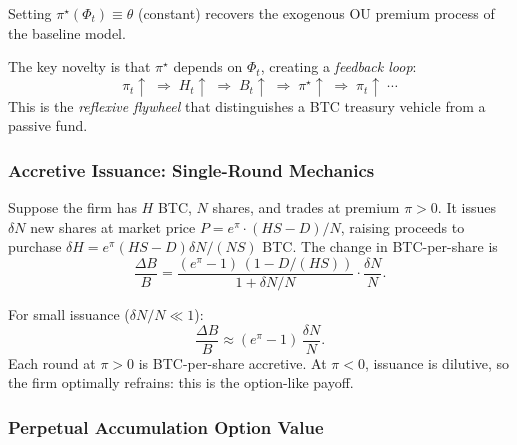 \begin{remark}
  Setting $\pi^\star(\Phi_t) \equiv \theta$ (constant) recovers the exogenous
  OU premium process of the baseline model.
\end{remark}

The key novelty is that $\pi^\star$ depends on $\Phi_t$, creating a
\emph{feedback loop}:
\begin{equation}
  \label{eq:feedback_loop}
  \pi_t \uparrow \;\Longrightarrow\;
  H_t \uparrow \;\Longrightarrow\;
  B_t \uparrow \;\Longrightarrow\;
  \pi^\star \uparrow \;\Longrightarrow\;
  \pi_t \uparrow \;\cdots
\end{equation}
This is the \emph{reflexive flywheel} that distinguishes a BTC treasury
vehicle from a passive fund.

\subsubsection{Accretive Issuance: Single-Round Mechanics}
\label{sec:single_round}

\begin{definition}
  \label{def:single_accretion}
  Suppose the firm has $H$ BTC, $N$ shares, and trades at premium $\pi > 0$.
  It issues $\delta N$ new shares at market price
  $P = e^\pi \cdot (HS - D)/N$, raising proceeds to purchase
  $\delta H = e^\pi(HS-D)\delta N / (NS)$ BTC.  The change in BTC-per-share
  is
  \begin{equation}
    \label{eq:accretion_single}
    \frac{\Delta B}{B}
    = \frac{(e^\pi - 1)\,(1 - D/(HS))}{1 + \delta N / N}\cdot
      \frac{\delta N}{N}.
  \end{equation}
\end{definition}

For small issuance ($\delta N / N \ll 1$):
\begin{equation}
  \label{eq:accretion_approx}
  \frac{\Delta B}{B} \approx (e^\pi - 1)\,\frac{\delta N}{N}.
\end{equation}
Each round at $\pi > 0$ is BTC-per-share accretive.  At $\pi < 0$,
issuance is dilutive, so the firm optimally refrains: this is the
option-like payoff.

\subsubsection{Perpetual Accumulation Option Value}
\label{sec:vacc}

